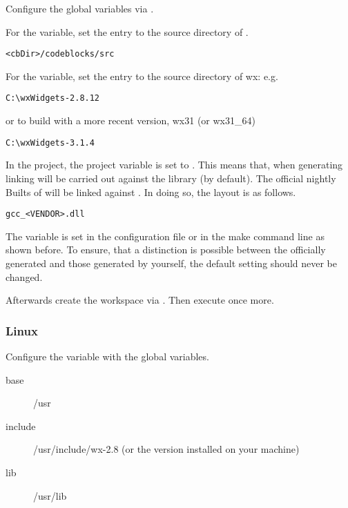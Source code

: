 Configure the global variables via .


For the  variable, set the  entry to the source directory of \codeblocks.

\begin{verbatim}
<cbDir>/codeblocks/src
\end{verbatim}


For the  variable, set the  entry to the source directory of wx: e.g.

\begin{verbatim}
C:\wxWidgets-2.8.12
\end{verbatim}

or to build with a more recent version, wx31 (or wx31\_64)

\begin{verbatim}
C:\wxWidgets-3.1.4
\end{verbatim}

In the \codeblocks project, the project variable  is set to . This means that, when generating \codeblocks linking will be carried out against the  library (by default). The official nightly Builts of \codeblocks will be linked against . In doing so, the layout is as follows.

\begin{verbatim}
gcc_<VENDOR>.dll
\end{verbatim}

The  variable is set in the configuration file  or in the make command line as shown before. To ensure, that a distinction is possible between the officially generated \codeblocks and those generated by yourself, the default setting  should never be changed.

Afterwards create the workspace  via . Then execute  once more.

\subsubsection{Linux}

Configure the  variable with the global variables.

\begin{description}
\item[base] /usr
\item[include] /usr/include/wx-2.8 (or the version installed on your machine)
\item[lib] /usr/lib
\end{description}


